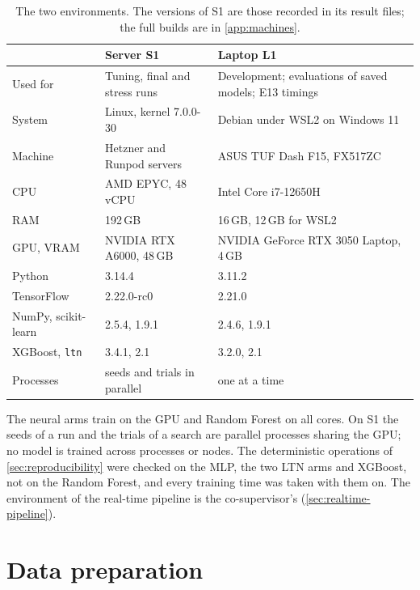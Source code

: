 \begin{table}[t]
\centering
\footnotesize
\caption{The two environments. The versions of S1 are those recorded in its result files; the full builds are in \cref{app:machines}.}
\label{tab:impl-environments}
\setlength{\tabcolsep}{4pt}
\begin{tabular}{@{}p{2.4cm}p{5.2cm}p{5.4cm}@{}}
\toprule
 & Server S1 & Laptop L1 \\
\midrule
Used for & Tuning, final and stress runs & Development; evaluations of saved models; E13 timings \\
System & Linux, kernel 7.0.0-30 & Debian under WSL2 on Windows 11 \\
Machine & Hetzner and Runpod servers & ASUS TUF Dash F15, FX517ZC \\
CPU & AMD EPYC, 48 vCPU & Intel Core i7-12650H \\
RAM & 192\,GB & 16\,GB, 12\,GB for WSL2 \\
GPU, VRAM & NVIDIA RTX A6000, 48\,GB & NVIDIA GeForce RTX 3050 Laptop, 4\,GB \\
Python & 3.14.4 & 3.11.2 \\
TensorFlow & 2.22.0-rc0 & 2.21.0 \\
NumPy, scikit-learn & 2.5.4, 1.9.1 & 2.4.6, 1.9.1 \\
XGBoost, \texttt{ltn} & 3.4.1, 2.1 & 3.2.0, 2.1 \\
Processes & seeds and trials in parallel & one at a time \\
\bottomrule
\end{tabular}
\end{table}

The neural arms train on the GPU and Random Forest on all cores. On S1 the seeds of a
run and the trials of a search are parallel processes sharing the GPU; no model is trained across
processes or nodes. The deterministic operations of \cref{sec:reproducibility} were checked on
the MLP, the two LTN arms and XGBoost, not on the Random Forest, and every training time was taken
with them on. The environment of the real-time pipeline is the co-supervisor's
(\cref{sec:realtime-pipeline}).

\section{Data preparation}
\label{sec:impl-data}

